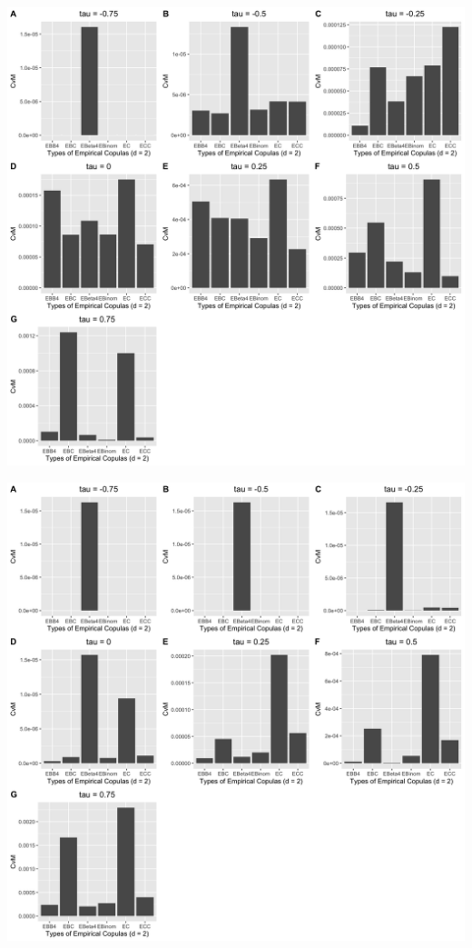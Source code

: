 \documentclass[12pt]{report}
\newcommand{\1}{\mathbf{1}}
\begin{document}
\begin{flushleft}
\begin{center}
\label{t4_2d_s_CvM}
\includegraphics[width=17cm]{ExceedanceCvM/t4_2d_s_CvM.png}
\end{center}%

\begin{center}
\label{N_2d_s_CvM}
\includegraphics[width=17cm]{ExceedanceCvM/N_2d_s_CvM.png}
\end{center}%


\end{flushleft}
\end{document}
